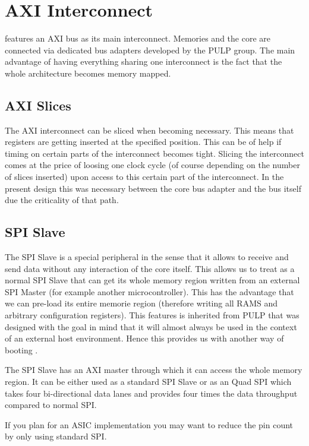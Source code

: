 \section{AXI Interconnect}

\pulpino features an AXI bus as its main interconnect. Memories and the core are connected via dedicated bus adapters developed by the PULP group. The main advantage of having everything sharing one interconnect is the fact that the whole architecture becomes memory mapped.

\subsection{AXI Slices}

The AXI interconnect can be sliced when becoming necessary. This means that registers are getting inserted at the specified position. This can be of help if timing on certain parts of the interconnect becomes tight. Slicing the interconnect comes at the price of loosing one clock cycle (of course depending on the number of slices inserted) upon access to this certain part of the interconnect. In the present \pulpino design this was necessary between the core bus adapter and the bus itself due the criticality of that path.


\subsection{SPI Slave}
\label{subsec:spi_slave}

The SPI Slave is a special peripheral in the sense that it allows to receive and send data without any interaction of the core itself. This allows us to treat \pulpino as a normal SPI Slave that can get its whole memory region written from an external SPI Master (for example another microcontroller). This has the advantage that we can pre-load its entire memorie region (therefore writing all RAMS and arbitrary configuration registers). This features is inherited from PULP that was designed with the goal in mind that it will almost always be used in the context of an external host environment. Hence this provides us with another way of booting \pulpino.

The SPI Slave has an AXI master through which it can access the whole memory region. It can be either used as a standard SPI Slave or as an Quad SPI which takes four bi-directional data lanes and provides four times the data throughput compared to normal SPI.

If you plan for an ASIC implementation you may want to reduce the pin count by only using standard SPI. 

